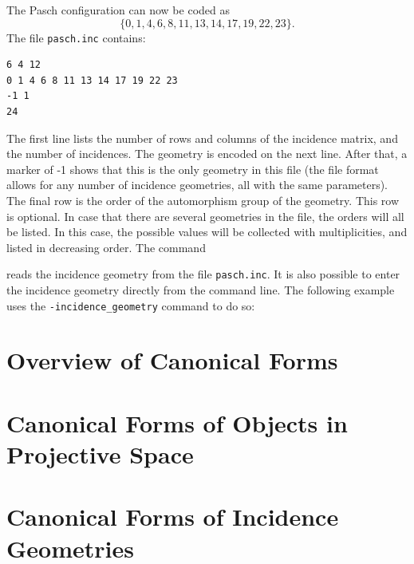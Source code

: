 The Pasch configuration can now be coded as 
$$
\{0,1,4,6,8,11,13,14,17,19,22,23\}.
$$
The file \verb'pasch.inc' contains:
\begin{verbatim}
6 4 12
0 1 4 6 8 11 13 14 17 19 22 23 
-1 1
24
\end{verbatim}
The first line lists the number of rows and columns of the incidence matrix, and the number of incidences. 
The geometry is encoded on the next line. After that, a marker of -1 shows that this is the only 
geometry in this file (the file format allows for any number of incidence geometries, all with the same parameters).
The final row is the order of the automorphism group of the geometry. 
This row is optional. In case that there are several geometries in the file, 
the orders will all be listed. In this case, the possible values will be 
collected with multiplicities, and listed in decreasing order.
The command 
{\tt

}
reads the incidence geometry from the file \verb'pasch.inc'.
It is also possible to enter the incidence geometry directly from the command line. The following example 
uses the \verb'-incidence_geometry' command to do so:
{\tt

}



\section{Overview of Canonical Forms}
\label{sec:canonical:form:overview}



	

\bigskip


\clearpage




\section{Canonical Forms of Objects in Projective Space}
\label{sec:canonical:form:objects:PG}



	

\bigskip


\clearpage

\section{Canonical Forms of Incidence Geometries}
\label{sec:canonical:form:objects:incidence:geometries}





